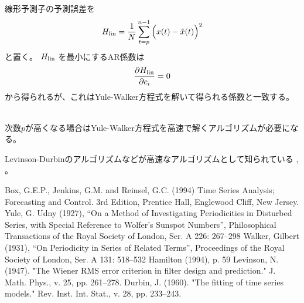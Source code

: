 \documentclass[uplatex,a4j,12pt,dvipdfmx]{jsarticle}
\begin{document}
線形予測子の予測誤差を
\[
	H_{\rm lin} = \frac{1}{N} \sum^{n-1}_{t=p} \Big( x(t) - \hat{x}(t) \Big)^{2}
\]
と置く。
$H_{\rm lin}$ を最小にするAR係数は
\[
	\frac{\partial H_{\rm lin}}{ \partial c_{i}} = 0
\]
から得られるが、これはYule-Walker方程式を解いて得られる係数と一致する。

\ \\

次数$p$が高くなる場合はYule-Walker方程式を高速で解くアルゴリズムが必要になる。

Levinson-Durbinのアルゴリズムなどが高速なアルゴリズムとして知られている
\cite{Levinson1947}, \cite{Durbin1960}
。


\begin{thebibliography}{9}
	 Box, G.E.P., Jenkins, G.M. and Reinsel, G.C. (1994) Time Series Analysis; Forecasting and Control. 3rd Edition, Prentice Hall, Englewood Cliff, New Jersey.
	 Yule, G. Udny (1927), “On a Method of Investigating Periodicities in Disturbed Series, with Special Reference to Wolfer's Sunspot Numbers”, Philosophical Transactions of the Royal Society of London, Ser. A 226: 267–298
	 Walker, Gilbert (1931), “On Periodicity in Series of Related Terms”, Proceedings of the Royal Society of London, Ser. A 131: 518–532 Hamilton (1994), p. 59
	 Levinson, N. (1947). "The Wiener RMS error criterion in filter design and prediction." J. Math. Phys., v. 25, pp. 261–278.
	 Durbin, J. (1960). "The fitting of time series models." Rev. Inst. Int. Stat., v. 28, pp. 233–243.

\end{thebibliography}
\end{document}
